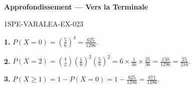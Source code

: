\begin{center}\textbf{Approfondissement — Vers la Terminale}\end{center}
\begin{corrige}{1SPE-VARALEA-EX-023}

\textbf{1.} $P(X=0) = \left(\frac{5}{6}\right)^4 = \frac{625}{1296}$.

\medskip
\textbf{2.} $P(X=2) = \binom{4}{2}\left(\frac{1}{6}\right)^2\left(\frac{5}{6}\right)^2 = 6 \times \frac{1}{36} \times \frac{25}{36} = \frac{150}{1296} = \frac{25}{216}$.

\medskip
\textbf{3.} $P(X \geq 1) = 1 - P(X=0) = 1 - \frac{625}{1296} = \frac{671}{1296}$.

\end{corrige}
